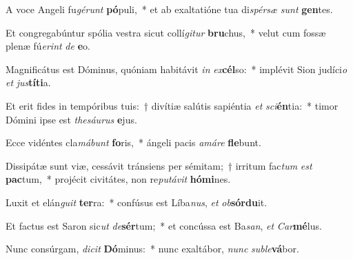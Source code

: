 \item A voce Angeli fu\textit{gé}\textit{runt} \textbf{pó}puli,~* et ab exaltatióne tua di\textit{spér}\textit{sæ} \textit{sunt} \textbf{gen}tes.
\item Et congregabúntur spólia vestra sicut collí\textit{gi}\textit{tur} \textbf{bru}chus,~* velut cum fossæ plenæ fú\textit{e}\textit{rint} \textit{de} \textbf{e}o.
\item Magnificátus est Dóminus, quóniam habitávit \textit{in} \textit{ex}\textbf{cél}so:~* implévit Sion judíci\textit{o} \textit{et} \textit{jus}\textbf{tí}\textbf{ti}a.
\item Et erit fides in tempóribus tuis:~† divítiæ salútis sapiéntia \textit{et} \textit{sci}\textbf{én}tia:~* timor Dómini ipse est \textit{the}\textit{sáu}\textit{rus} \textbf{e}jus.
\item Ecce vidéntes cla\textit{má}\textit{bunt} \textbf{fo}ris,~* ángeli pacis \textit{a}\textit{má}\textit{re} \textbf{fle}bunt.
\item Dissipátæ sunt viæ, cessávit tránsiens per sémitam;~† irritum fac\textit{tum} \textit{est} \textbf{pac}tum,~* projécit civitátes, non re\textit{pu}\textit{tá}\textit{vit} \textbf{hó}\textbf{mi}nes.
\item Luxit et elán\textit{gu}\textit{it} \textbf{ter}ra:~* confúsus est Líba\textit{nus}, \textit{et} \textit{ob}\textbf{sór}\textbf{du}it.
\item Et factus est Saron sic\textit{ut} \textit{de}\textbf{sér}tum;~* et concússa est Ba\textit{san}, \textit{et} \textit{Car}\textbf{mé}lus.
\item Nunc consúrgam, \textit{di}\textit{cit} \textbf{Dó}minus:~* nunc exaltábor, \textit{nunc} \textit{sub}\textit{le}\textbf{vá}bor.
